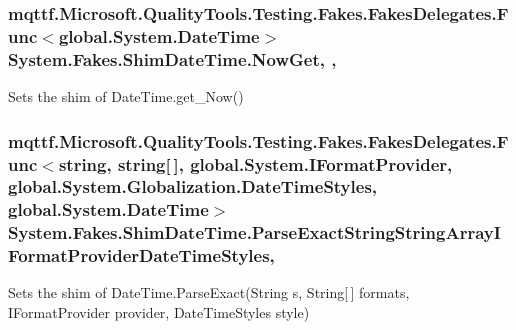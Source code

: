 \hypertarget{class_system_1_1_fakes_1_1_shim_date_time_a6ce9fabaa922443b0bc2197082a9ff7e}{
\subsubsection[{Now\-Get}]{\setlength{\rightskip}{0pt plus 5cm}mqttf.\-Microsoft.\-Quality\-Tools.\-Testing.\-Fakes.\-Fakes\-Delegates.\-Func$<$global.\-System.\-Date\-Time$>$ System.\-Fakes.\-Shim\-Date\-Time.\-Now\-Get\hspace{0.3cm}{\ttfamily [static]}, {\ttfamily [get]}, {\ttfamily [set]}}}\label{class_system_1_1_fakes_1_1_shim_date_time_a6ce9fabaa922443b0bc2197082a9ff7e}


Sets the shim of Date\-Time.\-get\-\_\-\-Now()

\hypertarget{class_system_1_1_fakes_1_1_shim_date_time_a864cc9c520e47c34eda4d961352a8f4a}{
\subsubsection[{Parse\-Exact\-String\-String\-Array\-I\-Format\-Provider\-Date\-Time\-Styles}]{\setlength{\rightskip}{0pt plus 5cm}mqttf.\-Microsoft.\-Quality\-Tools.\-Testing.\-Fakes.\-Fakes\-Delegates.\-Func$<$string, string\mbox{[}$\,$\mbox{]}, global.\-System.\-I\-Format\-Provider, global.\-System.\-Globalization.\-Date\-Time\-Styles, global.\-System.\-Date\-Time$>$ System.\-Fakes.\-Shim\-Date\-Time.\-Parse\-Exact\-String\-String\-Array\-I\-Format\-Provider\-Date\-Time\-Styles\hspace{0.3cm}{\ttfamily [static]}, {\ttfamily [set]}}}\label{class_system_1_1_fakes_1_1_shim_date_time_a864cc9c520e47c34eda4d961352a8f4a}


Sets the shim of Date\-Time.\-Parse\-Exact(\-String s, String\mbox{[}$\,$\mbox{]} formats, I\-Format\-Provider provider, Date\-Time\-Styles style)

